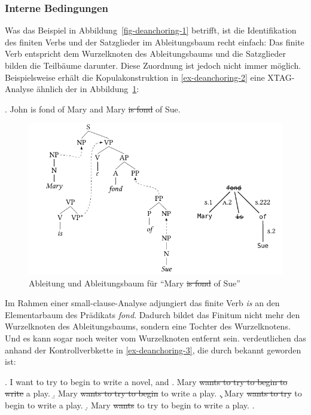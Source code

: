 \subsubsection*{Interne Bedingungen} 

Was das Beispiel in Abbildung~\ref{fig-deanchoring-1} betrifft, ist die Identifikation des finiten Verbs und der Satzglieder im Ableitungsbaum recht einfach: Das finite Verb entspricht dem Wurzelknoten des Ableitungsbaums und die Satzglieder bilden die Teilbäume darunter. Diese Zuordnung ist jedoch nicht immer möglich. Beispielsweise erhält die Kopulakonstruktion in \ref{ex-deanchoring-2} eine XTAG-Analyse ähnlich der in Abbildung~\ref{fig-deanchoring-3}:    
  
\ex. \label{ex-deanchoring-2} John is fond of Mary and Mary \sout{is fond} of  Sue.
\hfill \citep[(4a)]{Lichte:Kallmeyer:10}

\begin{figure}[t]
\centering
\includegraphics{graphics/abb816.pdf}
\caption{\label{fig-deanchoring-3}Ableitung und Ableitungsbaum für "`Mary \sout{is fond} of Sue"' \citep[Figure~4]{Lichte:Kallmeyer:10}}
\end{figure} 
Im Rahmen einer small-clause-Analyse adjungiert das finite Verb {\it is} an den Elementarbaum des Prädikats {\it fond}. Dadurch bildet das Finitum nicht mehr den Wurzelknoten des Ableitungsbaums, sondern eine Tochter des Wurzelknotens. Und es kann sogar noch weiter vom Wurzelknoten entfernt sein. \cite{Lichte:Kallmeyer:10} verdeutlichen das anhand der Kontroll\-verb\-kette in \ref{ex-deanchoring-3}, die durch \cite{Ross:70} bekannt geworden ist:  

\ex. \label{ex-deanchoring-3} I want to try to begin to write a novel, and
\a. Mary \sout{wants to try to begin to write} a play.\label{ex-deanchoring-3-a}
\b. Mary \sout{wants to try to begin} to write a play.\label{ex-ross-70-b}
\c. Mary \sout{wants to try} to begin to write a play.\label{ex-ross-70-c}
\d. Mary \sout{wants} to try to begin to write a play.\label{ex-ross-70-d}
\z. \citep[(2-c)]{Ross:70}

